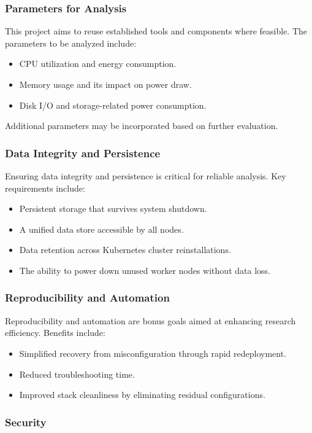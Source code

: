 \subsubsection{Parameters for Analysis}

This project aims to reuse established tools and components where feasible. The parameters to be analyzed include:
\begin{itemize}
\item CPU utilization and energy consumption.
\item Memory usage and its impact on power draw.
\item Disk I/O and storage-related power consumption.
\end{itemize}
Additional parameters may be incorporated based on further evaluation.

\subsubsection{Data Integrity and Persistence}

Ensuring data integrity and persistence is critical for reliable analysis. Key requirements include:
\begin{itemize}
\item Persistent storage that survives system shutdown.
\item A unified data store accessible by all nodes.
\item Data retention across Kubernetes cluster reinstallations.
\item The ability to power down unused worker nodes without data loss.
\end{itemize}

\subsubsection{Reproducibility and Automation}

Reproducibility and automation are bonus goals aimed at enhancing research efficiency. Benefits include:
\begin{itemize}
\item Simplified recovery from misconfiguration through rapid redeployment.
\item Reduced troubleshooting time.
\item Improved stack cleanliness by eliminating residual configurations.
\end{itemize}

\subsubsection{Security}

